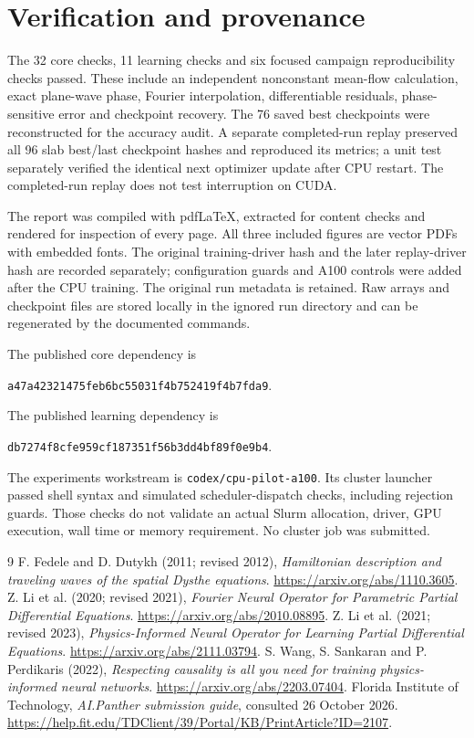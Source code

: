 \documentclass[11pt]{article}
\begin{document}
\newpage
\section*{Verification and provenance}
The 32 core checks, 11 learning checks and six focused campaign reproducibility checks passed. These include an independent nonconstant mean-flow calculation, exact plane-wave phase, Fourier interpolation, differentiable residuals, phase-sensitive error and checkpoint recovery. The 76 saved best checkpoints were reconstructed for the accuracy audit. A separate completed-run replay preserved all 96 slab best/last checkpoint hashes and reproduced its metrics; a unit test separately verified the identical next optimizer update after CPU restart. The completed-run replay does not test interruption on CUDA.

The report was compiled with pdfLaTeX, extracted for content checks and rendered for inspection of every page. All three included figures are vector PDFs with embedded fonts. The original training-driver hash and the later replay-driver hash are recorded separately; configuration guards and A100 controls were added after the CPU training. The original run metadata is retained. Raw arrays and checkpoint files are stored locally in the ignored run directory and can be regenerated by the documented commands.

The published core dependency is
\begin{center}\small\texttt{a47a42321475feb6bc55031f4b752419f4b7fda9}.\end{center}
The published learning dependency is
\begin{center}\small\texttt{db7274f8cfe959cf187351f56b3dd4bf89f0e9b4}.\end{center}
The experiments workstream is \texttt{codex/cpu-pilot-a100}. Its cluster launcher passed shell syntax and simulated scheduler-dispatch checks, including rejection guards. Those checks do not validate an actual Slurm allocation, driver, GPU execution, wall time or memory requirement. No cluster job was submitted.

\begin{thebibliography}{9}\small
{} F. Fedele and D. Dutykh (2011; revised 2012), \emph{Hamiltonian description and traveling waves of the spatial Dysthe equations}. \url{https://arxiv.org/abs/1110.3605}.
 Z. Li et al. (2020; revised 2021), \emph{Fourier Neural Operator for Parametric Partial Differential Equations}. \url{https://arxiv.org/abs/2010.08895}.
 Z. Li et al. (2021; revised 2023), \emph{Physics-Informed Neural Operator for Learning Partial Differential Equations}. \url{https://arxiv.org/abs/2111.03794}.
 S. Wang, S. Sankaran and P. Perdikaris (2022), \emph{Respecting causality is all you need for training physics-informed neural networks}. \url{https://arxiv.org/abs/2203.07404}.
 Florida Institute of Technology, \emph{AI.Panther submission guide}, consulted 26 October 2026. \url{https://help.fit.edu/TDClient/39/Portal/KB/PrintArticle?ID=2107}.
\end{thebibliography}
\end{document}
